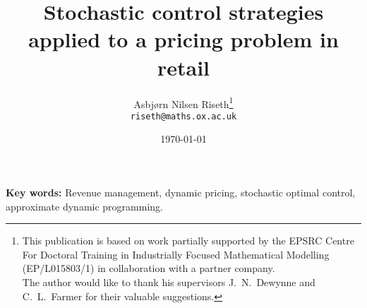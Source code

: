 \documentclass[a4paper,12pt]{article}
\title{Stochastic control strategies applied to a
  pricing problem in retail}
\author{Asbj{\o}rn Nilsen Riseth\thanks{
    This publication is based on work partially supported by the EPSRC
    Centre For Doctoral Training in Industrially Focused Mathematical
    Modelling (EP/L015803/1) in collaboration with a partner
    company.\\
    The author would like to thank his supervisors
    J.~N.~Dewynne and C.~L.~Farmer for their valuable suggestions.}\\
  {\footnotesize\texttt{riseth@maths.ox.ac.uk}}}
\affil{Mathematical Institute, University
  of Oxford, OX2 6GG.}
\date{\today}
\def\biblio{}
\begin{document}
\maketitle
\listoftodos

\def\biblio{}
\def\listoftodos{}



\vspace{1em}\noindent
\textbf{Key words:} Revenue management, dynamic pricing, stochastic
optimal control,
approximate dynamic programming.





% 


\clearpage





\end{document}
